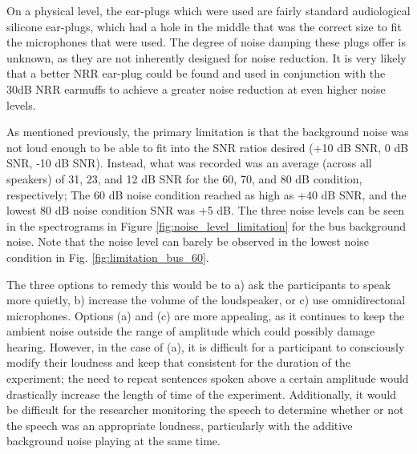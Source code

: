 On a physical level, the ear-plugs which were used are fairly standard audiological silicone ear-plugs, which had a hole in the middle that was the correct size to fit the microphones that were used.  The degree of noise damping these plugs offer is unknown, as they are not inherently designed for noise reduction.  It is very likely that a better NRR ear-plug could be found and used in conjunction with the 30dB NRR earmuffs to achieve a greater noise reduction at even higher noise levels.

As mentioned previously, the primary limitation is that the background noise was not loud enough to be able to fit into the SNR ratios desired (+10 dB SNR, 0 dB SNR, -10 dB SNR).  Instead, what was recorded was an average (across all speakers) of 31, 23, and 12 dB SNR for the 60, 70, and 80 dB condition, respectively; The 60 dB noise condition reached as high as +40 dB SNR, and the lowest 80 dB noise condition SNR was +5 dB. The three noise levels can be seen in the spectrograms in Figure \ref{fig:noise_level_limitation} for the bus background noise.  Note that the noise level can barely be observed in the lowest noise condition in Fig. \ref{fig:limitation_bus_60}.

The three options to remedy this would be to a) ask the participants to speak more quietly, b) increase the volume of the loudspeaker, or c) use omnidirectonal microphones.  Options (a) and (c) are more appealing, as it continues to keep the ambient noise outside the range of amplitude which could possibly damage hearing.  However, in the case of (a), it is difficult for a participant to consciously modify their loudness and keep that consistent for the duration of the experiment; the need to repeat sentences spoken above a certain amplitude would drastically increase the length of time of the experiment.  Additionally, it would be difficult for the researcher monitoring the speech to determine whether or not the speech was an appropriate loudness, particularly with the additive background noise playing at the same time.  

